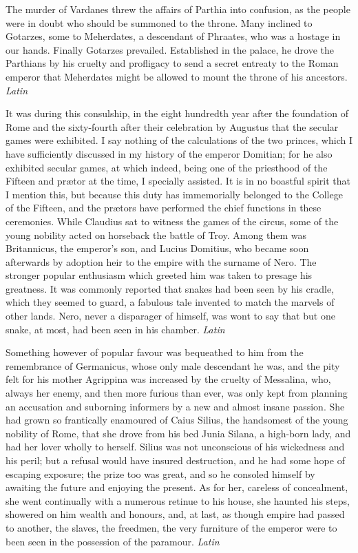 The murder of Vardanes threw the affairs of Parthia into confusion, as the people were in doubt who should be summoned to the throne. Many inclined to Gotarzes, some to Meherdates, a descendant of Phraates, who was a hostage in our hands. Finally Gotarzes prevailed. Established in the palace, he drove the Parthians by his cruelty and profligacy to send a secret entreaty to the Roman emperor that Meherdates might be allowed to mount the throne of his ancestors. \emph{Latin}


It was during this consulship, in the eight hundredth year after the foundation of Rome and the sixty-fourth after their celebration by Augustus that the secular games were exhibited. I say nothing of the calculations of the two princes, which I have sufficiently discussed in my history of the emperor Domitian; for he also exhibited secular games, at which indeed, being one of the priesthood of the Fifteen and prætor at the time, I specially assisted. It is in no boastful spirit that I mention this, but because this duty has immemorially belonged to the College of the Fifteen, and the prætors have performed the chief functions in these ceremonies. While Claudius sat to witness the games of the circus, some of the young nobility acted on horseback the battle of Troy. Among them was Britannicus, the emperor's son, and Lucius Domitius, who became soon afterwards by adoption heir to the empire with the surname of Nero. The stronger popular enthusiasm which greeted him was taken to presage his greatness. It was commonly reported that snakes had been seen by his cradle, which they seemed to guard, a fabulous tale invented to match the marvels of other lands. Nero, never a disparager of himself, was wont to say that but one snake, at most, had been seen in his chamber. \emph{Latin}


Something however of popular favour was bequeathed to him from the remembrance of Germanicus, whose only male descendant he was, and the pity felt for his mother Agrippina was increased by the cruelty of Messalina, who, always her enemy, and then more furious than ever, was only kept from planning an accusation and suborning informers by a new and almost insane passion. She had grown so frantically enamoured of Caius Silius, the handsomest of the young nobility of Rome, that she drove from his bed Junia Silana, a high-born lady, and had her lover wholly to herself. Silius was not unconscious of his wickedness and his peril; but a refusal would have insured destruction, and he had some hope of escaping exposure; the prize too was great, and so he consoled himself by awaiting the future and enjoying the present. As for her, careless of concealment, she went continually with a numerous retinue to his house, she haunted his steps, showered on him wealth and honours, and, at last, as though empire had passed to another, the slaves, the freedmen, the very furniture of the emperor were to been seen in the possession of the paramour. \emph{Latin}

